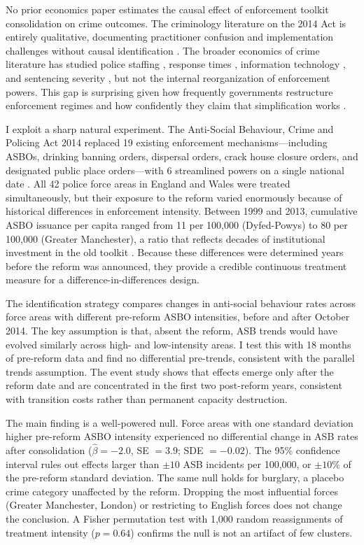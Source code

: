 \documentclass[12pt]{article}
\begin{document}
No prior economics paper estimates the causal effect of enforcement toolkit consolidation on crime outcomes. The criminology literature on the 2014 Act is entirely qualitative, documenting practitioner confusion and implementation challenges without causal identification \citep{mceachern2018}. The broader economics of crime literature has studied police staffing \citep{levitt1997, chalfin2022}, response times \citep{blanes2023}, information technology \citep{mastrobuoni2020}, and sentencing severity \citep{drago2009}, but not the internal reorganization of enforcement powers. This gap is surprising given how frequently governments restructure enforcement regimes and how confidently they claim that simplification works \citep{homeoffice2014guide}.

I exploit a sharp natural experiment. The Anti-Social Behaviour, Crime and Policing Act 2014 replaced 19 existing enforcement mechanisms---including ASBOs, drinking banning orders, dispersal orders, crack house closure orders, and designated public place orders---with 6 streamlined powers on a single national date \citep{homeoffice2014guide}. All 42 police force areas in England and Wales were treated simultaneously, but their exposure to the reform varied enormously because of historical differences in enforcement intensity. Between 1999 and 2013, cumulative ASBO issuance per capita ranged from 11 per 100,000 (Dyfed-Powys) to 80 per 100,000 (Greater Manchester), a ratio that reflects decades of institutional investment in the old toolkit \citep{homeoffice2014}. Because these differences were determined years before the reform was announced, they provide a credible continuous treatment measure for a difference-in-differences design.

The identification strategy compares changes in anti-social behaviour rates across force areas with different pre-reform ASBO intensities, before and after October 2014. The key assumption is that, absent the reform, ASB trends would have evolved similarly across high- and low-intensity areas. I test this with 18 months of pre-reform data and find no differential pre-trends, consistent with the parallel trends assumption. The event study shows that effects emerge only after the reform date and are concentrated in the first two post-reform years, consistent with transition costs rather than permanent capacity destruction.

The main finding is a well-powered null. Force areas with one standard deviation higher pre-reform ASBO intensity experienced no differential change in ASB rates after consolidation ($\hat{\beta} = -2.0$, SE $= 3.9$; SDE $= -0.02$). The 95\% confidence interval rules out effects larger than $\pm 10$ ASB incidents per 100,000, or $\pm 10\%$ of the pre-reform standard deviation. The same null holds for burglary, a placebo crime category unaffected by the reform. Dropping the most influential forces (Greater Manchester, London) or restricting to English forces does not change the conclusion. A Fisher permutation test with 1,000 random reassignments of treatment intensity ($p = 0.64$) confirms the null is not an artifact of few clusters.
\end{document}
